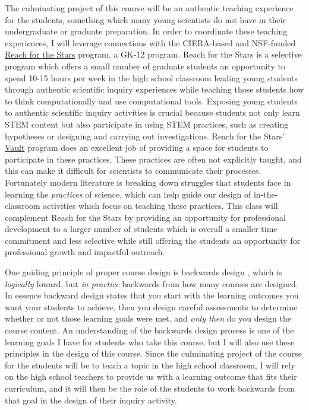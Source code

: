 \documentclass[aasms,12pt]{article}
\begin{document}
The culminating project of this course will be an authentic teaching experience for the students, something which many young scientists do not have in their undergraduate or graduate preparation.
In order to coordinate these teaching experiences, I will leverage connections with the CIERA-based and NSF-funded \href{http://gk12.ciera.northwestern.edu/}{Reach for the Stars} program, a GK-12 program.
Reach for the Stars is a selective program which offers a small number of graduate students an opportunity to spend 10-15 hours per week in the high school classroom leading young students through authentic scientific inquiry experiences while teaching those students how to think computationally and use computational tools.
Exposing young students to authentic scientific inquiry activities is crucial because students not only learn STEM content but also participate in using STEM practices, such as creating hypotheses or designing and carrying out investigations.
Reach for the Stars' \href{https://avault.github.io/}{Vault} program does an excellent job of providing a space for students to participate in these practices.
These practices are often not explicitly taught, and this can make it difficult for scientists to communicate their processes.
Fortunately modern literature \citep[e.g.,][]{dasgupta&all2014} is breaking down struggles that students face in learning the \emph{practices} of science, which can help guide our design of in-the-classroom activities which focus on teaching these practices.
This class will complement Reach for the Stars by providing an opportunity for professional development to a larger number of students which is overall a smaller time commitment and less selective while still offering the students an opportunity for professional growth and impactful outreach.

One guiding principle of proper course design is backwards design \citep{wiggins&mctighe1998}, which is \emph{logically} foward, but \emph{in practice} backwards from how many courses are designed.
In essence backward design states that you start with the learning outcomes you want your students to achieve, then you design careful assessments to determine whether or not those learning goals were met, and \emph{only then} do you design the course content.
An understanding of the backwards design process is one of the learning goals I have for students who take this course, but I will also use these principles in the design of this course.
Since the culminating project of the course for the students will be to teach a topic in the high school classroom, I will rely on the high school teachers to provide us with a learning outcome that fits their curriculum, and it will then be the role of the students to work backwards from that goal in the design of their inquiry activity.
\end{document}
